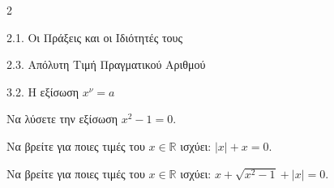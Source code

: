 \begin{ylh}{2}
    \item 2.1. Οι Πράξεις και οι Ιδιότητές τους
    \item 2.3. Απόλυτη Τιμή Πραγματικού Αριθμού
    \item 3.2. Η εξίσωση $x^{\nu}=a$
\end{ylh}

\begin{alist}
\item Να λύσετε την εξίσωση $x^2 - 1 = 0$.
\item Να βρείτε για ποιες τιμές του $x \in \mathbb{R}$ ισχύει: $|x| + x = 0$.
\item Να βρείτε για ποιες τιμές του $x \in \mathbb{R}$ ισχύει: $x + \sqrt{x^2 - 1} + |x| = 0$.
\end{alist}

